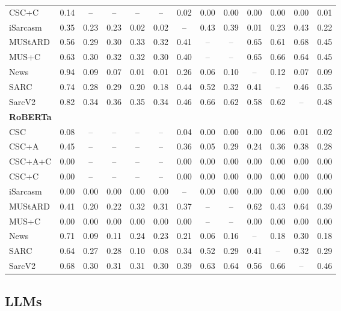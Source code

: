 \documentclass[sigconf, nonacm]{acmart}
\begin{document}
\begin{table}[htbp]
{\begin{tabular}{l|c|cccccccccc|c}
CSC+C & 0.14 & -- & -- & -- & -- & 0.02 & 0.00 & 0.00 & 0.00 & 0.00 & 0.00 & 0.01 \\
iSarcasm & 0.35 & 0.23 & 0.23 & 0.02 & 0.02 & -- & 0.43 & 0.39 & 0.01 & 0.23 & 0.43 & 0.22 \\
MUStARD & 0.56 & 0.29 & 0.30 & 0.33 & 0.32 & 0.41 & -- & -- & 0.65 & 0.61 & 0.68 & 0.45 \\
MUS+C & 0.63 & 0.30 & 0.32 & 0.32 & 0.30 & 0.40 & -- & -- & 0.65 & 0.66 & 0.64 & 0.45 \\
News & 0.94 & 0.09 & 0.07 & 0.01 & 0.01 & 0.26 & 0.06 & 0.10 & -- & 0.12 & 0.07 & 0.09 \\
SARC & 0.74 & 0.28 & 0.29 & 0.20 & 0.18 & 0.44 & 0.52 & 0.32 & 0.41 & -- & 0.46 & 0.35 \\
SarcV2 & 0.82 & 0.34 & 0.36 & 0.35 & 0.34 & 0.46 & 0.66 & 0.62 & 0.58 & 0.62 & -- & 0.48 \\
\midrule
\multicolumn{13}{l}{\textbf{RoBERTa}} \\
CSC & 0.08 & -- & -- & -- & -- & 0.04 & 0.00 & 0.00 & 0.00 & 0.06 & 0.01 & 0.02 \\
CSC+A & 0.45 & -- & -- & -- & -- & 0.36 & 0.05 & 0.29 & 0.24 & 0.36 & 0.38 & 0.28 \\
CSC+A+C & 0.00 & -- & -- & -- & -- & 0.00 & 0.00 & 0.00 & 0.00 & 0.00 & 0.00 & 0.00 \\
CSC+C & 0.00 & -- & -- & -- & -- & 0.00 & 0.00 & 0.00 & 0.00 & 0.00 & 0.00 & 0.00 \\
iSarcasm & 0.00 & 0.00 & 0.00 & 0.00 & 0.00 & -- & 0.00 & 0.00 & 0.00 & 0.00 & 0.00 & 0.00 \\
MUStARD & 0.41 & 0.20 & 0.22 & 0.32 & 0.31 & 0.37 & -- & -- & 0.62 & 0.43 & 0.64 & 0.39 \\
MUS+C & 0.00 & 0.00 & 0.00 & 0.00 & 0.00 & 0.00 & -- & -- & 0.00 & 0.00 & 0.00 & 0.00 \\
News & 0.71 & 0.09 & 0.11 & 0.24 & 0.23 & 0.21 & 0.06 & 0.16 & -- & 0.18 & 0.30 & 0.18 \\
SARC & 0.64 & 0.27 & 0.28 & 0.10 & 0.08 & 0.34 & 0.52 & 0.29 & 0.41 & -- & 0.32 & 0.29 \\
SarcV2 & 0.68 & 0.30 & 0.31 & 0.31 & 0.30 & 0.39 & 0.63 & 0.64 & 0.56 & 0.66 & -- & 0.46 \\
\bottomrule
\end{tabular}
}
\end{table}

\subsection{LLMs}
\end{document}
